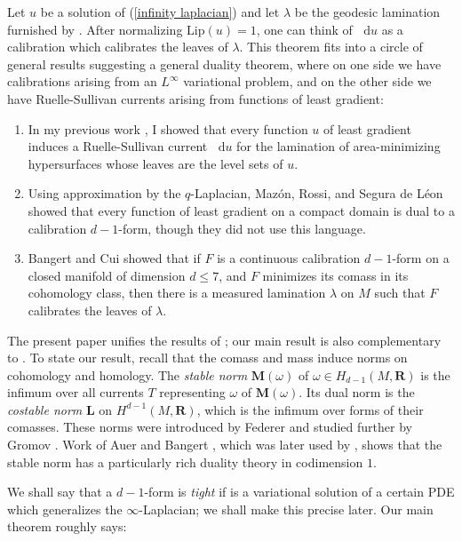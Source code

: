\documentclass[reqno,11pt]{amsart}
\newcommand{\RR}{\mathbf{R}}
\newcommand*\dif{\mathop{}\!\mathrm{d}}
\newcommand{\Lip}{\mathrm{Lip}}
\newcommand{\Mass}{\mathbf M}
\newcommand{\Comass}{\mathbf L}
\newcommand{\dfn}[1]{\emph{#1}\index{#1}}
\theoremstyle{definition}
\numberwithin{equation}{section}
\begin{document}
Let $u$ be a solution of (\ref{infinity laplacian}) and let $\lambda$ be the geodesic lamination furnished by \cite{daskalopoulos2020transverse}.
After normalizing $\Lip(u) = 1$, one can think of $\dif u$ as a calibration which calibrates the leaves of $\lambda$.
This theorem fits into a circle of general results suggesting a general duality theorem, where on one side we have calibrations arising from an $L^\infty$ variational problem, and on the other side we have Ruelle-Sullivan currents arising from functions of least gradient:
\begin{enumerate}
\item In my previous work \cite{BackusCML}, I showed that every function $u$ of least gradient induces a Ruelle-Sullivan current $\dif u$ for the lamination of area-minimizing hypersurfaces whose leaves are the level sets of $u$.
\item Using approximation by the $q$-Laplacian, Maz\'on, Rossi, and Segura de L\'eon \cite{Mazon14} showed that every function of least gradient on a compact domain is dual to a calibration $d - 1$-form, though they did not use this language.
\item Bangert and Cui \cite{bangert_cui_2017} showed that if $F$ is a continuous calibration $d - 1$-form on a closed manifold of dimension $d \leq 7$, and $F$ minimizes its comass in its cohomology class, then there is a measured lamination $\lambda$ on $M$ such that $F$ calibrates the leaves of $\lambda$.
\end{enumerate}

The present paper unifies the results of \cite{daskalopoulos2020transverse,bangert_cui_2017}; our main result is also complementary to \cite{Mazon14}.
To state our result, recall that the comass and mass induce norms on cohomology and homology.
The \dfn{stable norm} $\Mass(\omega)$ of $\omega \in H_{d - 1}(M, \RR)$ is the infimum over all currents $T$ representing $\omega$ of $\Mass(\omega)$.
Its dual norm is the \dfn{costable norm} $\Comass$ on $H^{d - 1}(M, \RR)$, which is the infimum over forms of their comasses.
These norms were introduced by Federer \cite{Federer1974} and studied further by Gromov \cite{gromov2007metric}.
Work of Auer and Bangert \cite{Auer01}, which was later used by \cite{bangert_cui_2017}, shows that the stable norm has a particularly rich duality theory in codimension $1$.

We shall say that a $d - 1$-form is \dfn{tight} if is a variational solution of a certain PDE which generalizes the $\infty$-Laplacian; we shall make this precise later.
Our main theorem roughly says:
\end{document}
